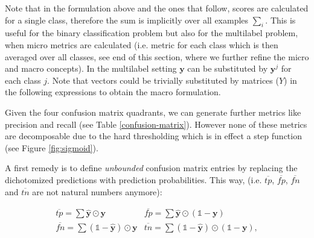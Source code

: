 Note that in the formulation above and the ones that follow, scores are calculated for a single class, therefore the sum is implicitly over all examples \(\sum_i\). This is useful for the binary classification problem but also for the multilabel problem, when micro metrics are calculated (i.e. metric for each class which is then averaged over all classes, see end of this section, where we further refine the micro and macro concepts). In the multilabel setting $\mathbf{y}$ can be substituted by $\mathbf{y}^j$ for each class $j$. Note that vectors could be trivially substituted by matrices ($Y$) in the following expressions to obtain the macro formulation.


Given the four confusion matrix quadrants, we can generate further metrics like precision and recall (see Table \ref{confusion-matrix}).  However none of these metrics are decomposable due to the hard thresholding which is in effect a step function (see Figure \ref{fig:sigmoid}).

A first remedy is to define \emph{unbounded} confusion matrix entries by replacing the dichotomized predictions with prediction probabilities. This way,
 (i.e. \(\overline{tp}\), \(\overline{fp}\), \(\overline{fn}\) and  \(\overline{tn}\) are not natural numbers anymore):

\begin{equation}
\label{eq:unbounded}
\begin{array}{ll} \overline{tp} = \sum \hat{\mathbf{y}} \odot \mathbf{y}  & \overline{fp} = \sum \hat{\mathbf{y}} \odot (\mathds{1} - \mathbf{y}) \\ \overline{fn} = \sum (\mathds{1} - \hat{\mathbf{y}}) \odot \mathbf{y} & \overline{tn} = \sum (\mathds{1} - \hat{\mathbf{y}}) \odot (\mathds{1} - \mathbf{y}),
\end{array}
\end{equation}

